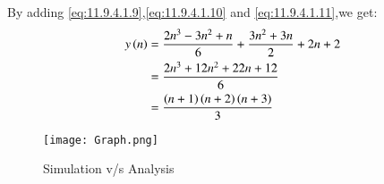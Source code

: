 \documentclass[journal,12pt,twocolumn]{IEEEtran}
\theoremstyle{remark}
\begin{document}
By adding \eqref{eq:11.9.4.1.9},\eqref{eq:11.9.4.1.10} and \eqref{eq:11.9.4.1.11},we get:
\begin{align}
    y\brak{n}&=\frac{2n^3-3n^2+n}{6}+\frac{3n^2+3n}{2}+2n+2\label{eq;11.9.4.1.12}\\
    &=\frac{2n^3+12n^2+22n+12}{6}\label{eq:11.9.4.1.13}\\
    &=\frac{\brak{n+1}\brak{n+2}\brak{n+3}}{3}\label{eq:11.9.4.1.14}
\end{align}
\begin{figure}[h]
        \centering
\texttt{[image: Graph.png]}
    \caption{Simulation v/s Analysis}
    \label{fig:plot11.9.4.1}
\end{figure}
\end{document}
